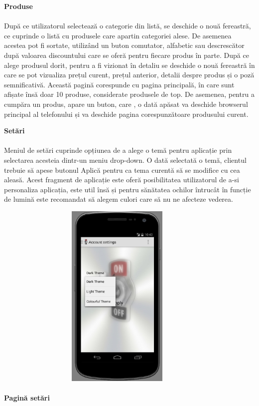 \textbf{Produse}
\paragraph{ }După ce utilizatorul selectează o categorie din listă, se deschide o nouă fereastră, ce cuprinde o listă cu produsele care apartin categoriei alese. De asemenea acestea pot fi sortate, utilizând un buton comutator, alfabetic sau descrescător după valoarea discountului care se oferă pentru fiecare produs în parte.
După ce alege produsul dorit, pentru a fi vizionat în detaliu se deschide o nouă fereastră în care se pot vizualiza prețul curent, prețul anterior, detalii despre produs și o poză semnificativă.  Această pagină corespunde cu pagina principală, în care sunt afișate însă doar 10 produse, considerate produsele de top. De asemenea, pentru a cumpăra un produs, apare un buton, care , o dată apăsat va deschide browserul principal al telefonului și va deschide pagina corespunzătoare produsului curent.

\textbf{Setări}
\paragraph{ } Meniul de setări cuprinde opțiunea de a alege o temă pentru aplicație prin selectarea acesteia dintr-un meniu drop-down. O dată selectată o temă, clientul trebuie să apese butonul Aplică pentru ca tema curentă să se modifice cu cea aleasă.  Acest fragment de aplicație este oferă posibilitatea utilizatorul de a-si personaliza aplicația, este util însă și pentru sănătatea ochilor întrucât în funcție de lumină este recomandat să alegem culori care să nu ne afecteze vederea. 

\begin{center}
\includegraphics[width=12cm,height=9cm,keepaspectratio]{imagini/settings.eps} %
\paragraph{}
\textbf{Pagină setări}
\end{center}

